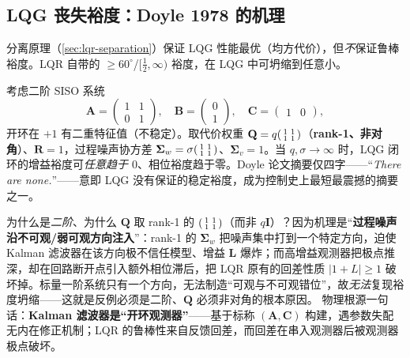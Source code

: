 \subsection{LQG 丧失裕度：Doyle 1978 的机理}
\label{sec:lqr-doyle}

分离原理（\cref{sec:lqr-separation}）保证 LQG 性能最优（均方代价），但\emph{不}保证鲁棒裕度。LQR 自带的 $\ge60^\circ$/$[\tfrac12,\infty)$ 裕度，在 LQG 中可坍缩到任意小。

\begin{example}\label{ex:lqr-doyle}
考虑二阶 SISO 系统
\begin{equation}
  \mathbf A=\begin{pmatrix}1&1\\0&1\end{pmatrix},\quad \mathbf B=\begin{pmatrix}0\\1\end{pmatrix},\quad \mathbf C=\begin{pmatrix}1&0\end{pmatrix},
  \label{eq:lqr-doyle-sys}
\end{equation}
开环在 $+1$ 有二重特征值（不稳定）。取代价权重 $\mathbf Q=q\begin{psmallmatrix}1&1\\1&1\end{psmallmatrix}$（\textbf{rank-1、非对角}）、$\mathbf R=1$，过程噪声协方差 $\boldsymbol\Sigma_w=\sigma\begin{psmallmatrix}1&1\\1&1\end{psmallmatrix}$、$\boldsymbol\Sigma_v=1$。当 $q,\sigma\to\infty$ 时，LQG 闭环的增益裕度可\emph{任意趋于 $0$}、相位裕度趋于零。Doyle 论文摘要仅四字——“\emph{There are none.}”——意即 LQG 没有保证的稳定裕度，成为控制史上最短最震撼的摘要之一。
\end{example}

\begin{insight}[坍缩机理]
为什么是\emph{二阶}、为什么 $\mathbf Q$ 取 rank-1 的 $\begin{psmallmatrix}1&1\\1&1\end{psmallmatrix}$（而非 $q\mathbf I$）？因为机理是“\textbf{过程噪声沿不可观/弱可观方向注入}”：rank-1 的 $\boldsymbol\Sigma_w$ 把噪声集中打到一个特定方向，迫使 Kalman 滤波器在该方向极不信任模型、增益 $\mathbf L$ 爆炸；而高增益观测器把极点推深，却在回路断开点引入额外相位滞后，把 LQR 原有的回差性质 $|1+L|\ge1$ 破坏掉。标量一阶系统只有一个方向，无法制造“可观与不可观错位”，故\emph{无法}复现裕度坍缩——这就是反例必须是二阶、$\mathbf Q$ 必须非对角的根本原因。
物理根源一句话：\textbf{Kalman 滤波器是“开环观测器”}——基于标称 $(\mathbf A,\mathbf C)$ 构建，遇参数失配无内在修正机制；LQR 的鲁棒性来自反馈回差，而回差在串入观测器后被观测器极点破坏。
\end{insight}

